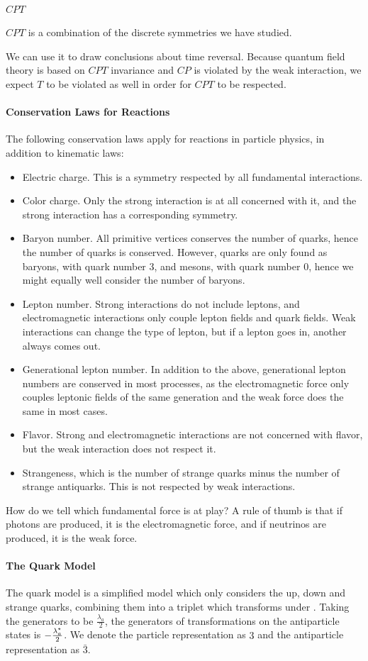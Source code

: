 \paragraph{$CPT$}
$CPT$ is a combination of the discrete symmetries we have studied.

We can use it to draw conclusions about time reversal. Because quantum field theory is based on $CPT$ invariance and $CP$ is violated by the weak interaction, we expect $T$ to be violated as well in order for $CPT$ to be respected.

\paragraph{Conservation Laws for Reactions}
The following conservation laws apply for reactions in particle physics, in addition to kinematic laws:
\begin{itemize}
	\item Electric charge. This is a symmetry respected by all fundamental interactions.
	\item Color charge. Only the strong interaction is at all concerned with it, and the strong interaction has a corresponding symmetry.
	\item Baryon number. All primitive vertices conserves the number of quarks, hence the number of quarks is conserved. However, quarks are only found as baryons, with quark number 3, and mesons, with quark number 0, hence we might equally well consider the number of baryons.
	\item Lepton number. Strong interactions do not include leptons, and electromagnetic interactions only couple lepton fields and quark fields. Weak interactions can change the type of lepton, but if a lepton goes in, another always comes out.
	\item Generational lepton number. In addition to the above, generational lepton numbers are conserved in most processes, as the electromagnetic force only couples leptonic fields of the same generation and the weak force does the same in most cases.
	\item Flavor. Strong and electromagnetic interactions are not concerned with flavor, but the weak interaction does not respect it.
	\item Strangeness, which is the number of strange quarks minus the number of strange antiquarks. This is not respected by weak interactions.
\end{itemize}

How do we tell which fundamental force is at play? A rule of thumb is that if photons are produced, it is the electromagnetic force, and if neutrinos are produced, it is the weak force.

\paragraph{The Quark Model}
The quark model is a simplified model which only considers the up, down and strange quarks, combining them into a triplet which transforms under . Taking the generators to be $\frac{\lambda_{a}}{2}$, the generators of transformations on the antiparticle states is $-\frac{\lambda_{a}^{\star}}{2}$. We denote the particle representation as $3$ and the antiparticle representation as $\bar{3}$.